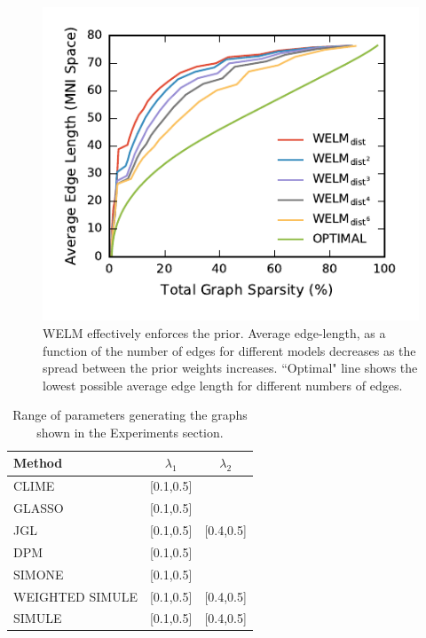 \documentclass{article}
\begin{document}
\begin{figure}[H]
	\centering
	\includegraphics[width=\columnwidth]{../../plots/edge_stats/edge_stats_v_num_features.pdf}
	\caption{WELM effectively enforces the prior. Average edge-length, as a function of the number of edges for different models decreases as the spread between the prior weights increases. ``Optimal" line shows the lowest possible average edge length for different numbers of edges.}
	\label{fig:edge_lengths}
\end{figure}

\begin{table}[H]
	\caption{Range of parameters generating the graphs shown in the Experiments section.}
	\label{tab:params}
	\vskip 0.15in
	\begin{center}
		\begin{small}
			\begin{sc}
				\begin{tabular}{lcc}
					\hline
					\abovespace\belowspace
					Method & $\lambda_1$ & $\lambda_2$ \\
					\hline
					\abovespace
					CLIME & [0.1,0.5] & \\
					GLASSO & [0.1,0.5] & \\
					JGL & [0.1,0.5] & [0.4,0.5]\\
					DPM & [0.1,0.5] & \\
					SIMONE & [0.1,0.5] & \\
					WEIGHTED SIMULE & [0.1,0.5] & [0.4,0.5]\\
					\belowspace
					SIMULE & [0.1,0.5] & [0.4,0.5]\\
					\hline
				\end{tabular}
			\end{sc}
		\end{small}
	\end{center}
	\vskip -0.1in
\end{table}
\end{document}
